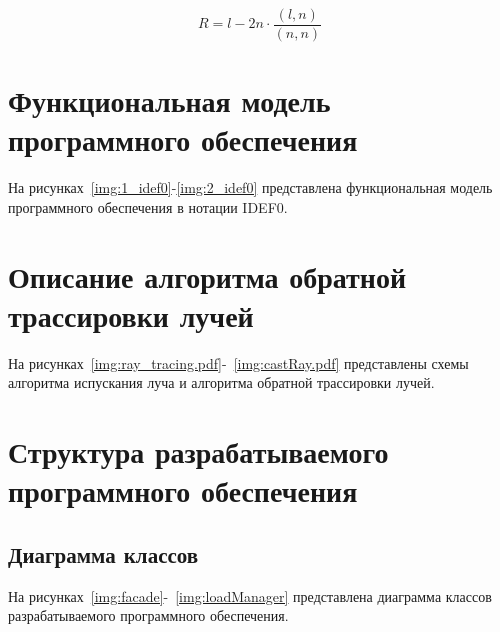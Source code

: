 \begin{equation}
	\label{reflect_ray}
	R = l - 2 n \cdot \frac{(l, n)}{(n, n)}
\end{equation}

\clearpage
\section{Функциональная модель программного обеспечения}
На рисунках~\ref{img:1_idef0}-\ref{img:2_idef0} представлена функциональная модель программного обеспечения в нотации IDEF0.

\FloatBarrier
{}
\FloatBarrier
{}
\FloatBarrier

\clearpage
\section{Описание алгоритма обратной трассировки лучей}
На рисунках~\ref{img:ray_tracing.pdf}-~\ref{img:castRay.pdf} представлены схемы алгоритма испускания луча и алгоритма обратной трассировки лучей.
\FloatBarrier
{}
\FloatBarrier
{}
\FloatBarrier


\clearpage
\section{Структура разрабатываемого программного обеспечения}
\subsection{Диаграмма классов}
На рисунках~\ref{img:facade}-~\ref{img:loadManager} представлена диаграмма классов разрабатываемого программного обеспечения.
\FloatBarrier
{}
\FloatBarrier
{}
\FloatBarrier
{}
\FloatBarrier

